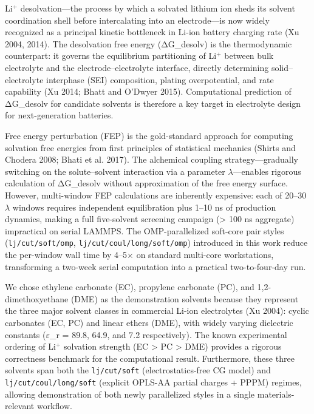 \documentclass[
  11pt,
]{article}
\begin{document}
Li\(^{+}\) desolvation---the process by which a solvated lithium ion
sheds its solvent coordination shell before intercalating into an
electrode---is now widely recognized as a principal kinetic bottleneck
in Li-ion battery charging rate (Xu 2004, 2014). The desolvation free
energy (ΔG\_desolv) is the thermodynamic counterpart: it governs the
equilibrium partitioning of Li\(^{+}\) between bulk electrolyte and the
electrode--electrolyte interface, directly determining
solid--electrolyte interphase (SEI) composition, plating overpotential,
and rate capability (Xu 2014; Bhatt and O'Dwyer 2015). Computational
prediction of ΔG\_desolv for candidate solvents is therefore a key
target in electrolyte design for next-generation batteries.

Free energy perturbation (FEP) is the gold-standard approach for
computing solvation free energies from first principles of statistical
mechanics (Shirts and Chodera 2008; Bhati et al. 2017). The alchemical
coupling strategy---gradually switching on the solute--solvent
interaction via a parameter \(\lambda\)---enables rigorous calculation
of ΔG\_desolv without approximation of the free energy surface. However,
multi-window FEP calculations are inherently expensive: each of 20--30
\(\lambda\) windows requires independent equilibration plus 1--10 ns of
production dynamics, making a full five-solvent screening campaign
(\textgreater{} 100 ns aggregate) impractical on serial LAMMPS. The
OMP-parallelized soft-core pair styles (\texttt{lj/cut/soft/omp},
\texttt{lj/cut/coul/long/soft/omp}) introduced in this work reduce the
per-window wall time by 4--5\(\times\) on standard multi-core
workstations, transforming a two-week serial computation into a
practical two-to-four-day run.

We chose ethylene carbonate (EC), propylene carbonate (PC), and
1,2-dimethoxyethane (DME) as the demonstration solvents because they
represent the three major solvent classes in commercial Li-ion
electrolytes (Xu 2004): cyclic carbonates (EC, PC) and linear ethers
(DME), with widely varying dielectric constants (\(\varepsilon\)\_r =
89.8, 64.9, and 7.2 respectively). The known experimental ordering of
Li\(^{+}\) solvation strength (EC \textgreater{} PC \textgreater{} DME)
provides a rigorous correctness benchmark for the computational result.
Furthermore, these three solvents span both the \texttt{lj/cut/soft}
(electrostatics-free CG model) and \texttt{lj/cut/coul/long/soft}
(explicit OPLS-AA partial charges + PPPM) regimes, allowing
demonstration of both newly parallelized styles in a single
materials-relevant workflow.
\end{document}
